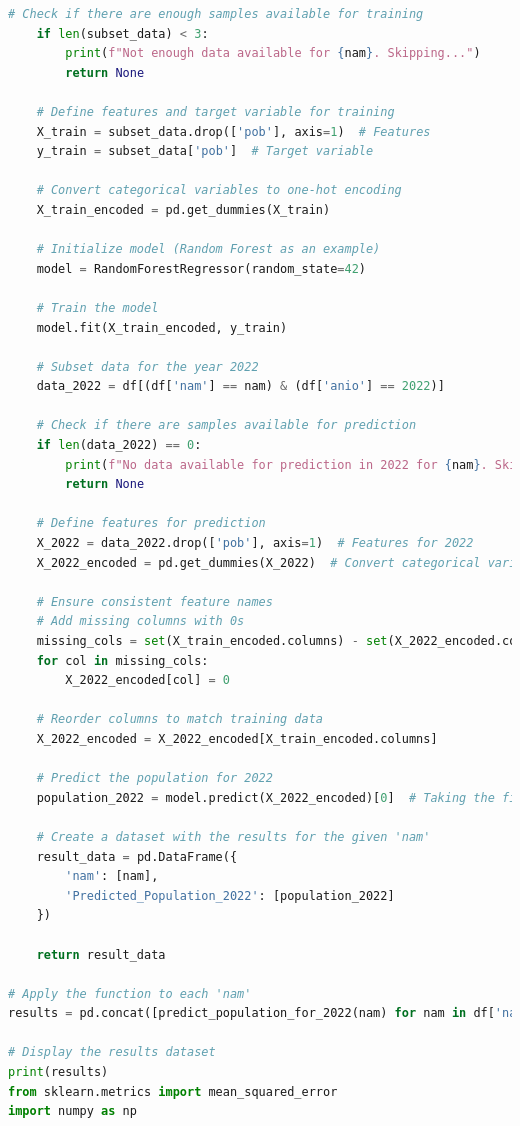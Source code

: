 \documentclass{article}
\theoremstyle{mytheoremstyle}
\theoremstyle{mytheoremstyle}
\theoremstyle{myproblemstyle}
\begin{document}
\begin{lstlisting}[language=Python, caption=Random Forest.ipynb,label={lst:RANDOMT.ipynb}]
    # Check if there are enough samples available for training
    if len(subset_data) < 3:
        print(f"Not enough data available for {nam}. Skipping...")
        return None
    
    # Define features and target variable for training
    X_train = subset_data.drop(['pob'], axis=1)  # Features
    y_train = subset_data['pob']  # Target variable
    
    # Convert categorical variables to one-hot encoding
    X_train_encoded = pd.get_dummies(X_train)
    
    # Initialize model (Random Forest as an example)
    model = RandomForestRegressor(random_state=42)
    
    # Train the model
    model.fit(X_train_encoded, y_train)
    
    # Subset data for the year 2022
    data_2022 = df[(df['nam'] == nam) & (df['anio'] == 2022)]
    
    # Check if there are samples available for prediction
    if len(data_2022) == 0:
        print(f"No data available for prediction in 2022 for {nam}. Skipping...")
        return None
    
    # Define features for prediction
    X_2022 = data_2022.drop(['pob'], axis=1)  # Features for 2022
    X_2022_encoded = pd.get_dummies(X_2022)  # Convert categorical variables
    
    # Ensure consistent feature names
    # Add missing columns with 0s
    missing_cols = set(X_train_encoded.columns) - set(X_2022_encoded.columns)
    for col in missing_cols:
        X_2022_encoded[col] = 0
    
    # Reorder columns to match training data
    X_2022_encoded = X_2022_encoded[X_train_encoded.columns]
    
    # Predict the population for 2022
    population_2022 = model.predict(X_2022_encoded)[0]  # Taking the first prediction
    
    # Create a dataset with the results for the given 'nam'
    result_data = pd.DataFrame({
        'nam': [nam],
        'Predicted_Population_2022': [population_2022]
    })
    
    return result_data

# Apply the function to each 'nam'
results = pd.concat([predict_population_for_2022(nam) for nam in df['nam'].unique() if predict_population_for_2022(nam) is not None], ignore_index=True)

# Display the results dataset
print(results)
from sklearn.metrics import mean_squared_error
import numpy as np


\end{lstlisting}
\end{document}
